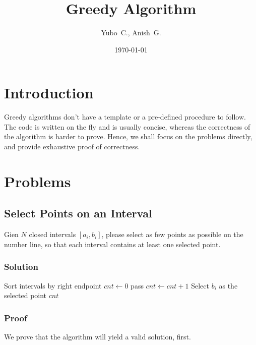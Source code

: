 \documentclass{article}
\title{Greedy Algorithm}
\date{\today}
\author{Yubo~C., Anish~G.}
\begin{document}
\maketitle

\newpage

\section{Introduction}

Greedy algorithms don't have a template or a pre-defined procedure to follow.
The code is written on the fly and is usually concise, whereas the correctness of the algorithm is harder to prove.
Hence, we shall focus on the problems directly, and provide exhaustive proof of correctness.

\section{Problems}

\subsection{Select Points on an Interval}

Gien $N$ closed intervals $[a_i,b_i]$, please select as few points as possible on the number line, so that each interval contains at least one selected point.

\subsubsection{Solution}

\begin{algorithm}[H]
    \BlankLine
    Sort intervals by right endpoint\;
    $cnt \gets 0$\;
    {
        {
            pass\;
        }
        \Else
        {
            $cnt \gets cnt + 1$\;
            Select $b_i$ as the selected point\;
        }
    }
    \Return $cnt$\;
\end{algorithm}

\subsubsection{Proof}

We prove that the algorithm will yield a valid solution, first.
\end{document}
